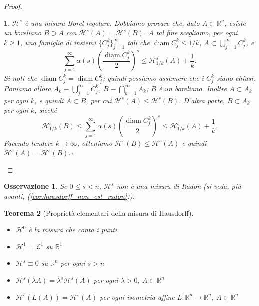\documentclass[a4paper,10pt,openright,oneside]{book}
\theoremstyle{theoremstyle}
\newtheorem{teorema}{Teorema}[section]
\theoremstyle{theoremstylewoheader}
\theoremstyle{theoremstyle}
\newtheorem{osservazione}[teorema]{Osservazione}
\theoremstyle{proofsecstyle}
\newtheorem{proofsec}{}
\theoremstyle{nonumberplain}
\newtheorem{proof}{Dim.}
\newcommand{\RR}{\ensuremath{\mathbb{R}}}
\newcommand{\Leb}{\ensuremath{\mathcal{L}}}
\newcommand{\Haus}{\ensuremath{\mathcal{H}}}
\newcommand{\closure}[1]{\ensuremath{\overline{#1}}}
\DeclareMathOperator{\diam}{diam}
\renewcommand{\qedsymbol}{\ensuremath{\square}}
\newcommand{\qed}{\unskip\nobreak\hfill\nobreak\hspace{.5em}\qedsymbol}
\begin{document}
\begin{proof}
\begin{proofsec}
\emph{$\Haus^s$ è una misura Borel regolare.}\hspace{.5em} Dobbiamo provare che, dato $A \subset \RR^n$, esiste un boreliano $B \supset A$ con $\Haus^s(A) = \Haus^s(B)$. A tal fine scegliamo, per ogni $k \ge 1$, una famiglia di insiemi $\{C_j^k\}_{j=1}^\infty$ tali che $\diam C_j^k \le 1/k$, $A \subset \bigcup_{j=1}^\infty C_j^k$, e
\[
\sum_{j=1}^\infty \alpha(s)\left(\frac{\diam C_j^k}{2}\right)^s \le \Haus_{1/k}^s (A) + \frac{1}{k}.
\]
Si noti che $\diam \closure{C_j^k} = \diam C_j^k$; quindi possiamo assumere che i $C_j^k$ siano chiusi. Poniamo allora $A_k \equiv \bigcup_{j=1}^\infty C_j^k$, $B \equiv \bigcap_{k=1}^\infty A_k$; $B$ è un boreliano. Inoltre $A \subset A_k$ per ogni $k$, e quindi $A \subset B$, per cui $\Haus^s(A) \le \Haus^s(B)$. D'altra parte, $B \subset A_k$ per ogni $k$, sicché
\[
\Haus_{1/k}^s (B) \le \sum_{j=1}^\infty \alpha(s)\left(\frac{\diam C_j^k}{2}\right)^s \le \Haus_{1/k}^s (A) + \frac{1}{k}.
\]
Facendo tendere $k \to \infty$, otteniamo $\Haus^s(B) \le \Haus^s(A)$ e quindi $\Haus^s(A) = \Haus^s(B)$.\qed
\end{proofsec}
\end{proof}

\begin{osservazione}
Se $0 \le s < n$, $\Haus^s$ \emph{non} è una misura di Radon (si veda, più avanti, (\ref{cor:hausdorff_non_est_radon})).
\end{osservazione}

\begin{teorema}[Proprietà elementari della misura di Hausdorff]
\label{thm:proprieta_misura_hausdorff}
\mbox{}
\begin{itemize}
\item[(i)] $\Haus^0$ è la misura che conta i punti
\item[(ii)] $\Haus^1 = \Leb^1$ su $\RR^1$
\item[(iii)] $\Haus^s \equiv 0$ su $\RR^n$ per ogni $s > n$
\item[(iv)] $\Haus^s (\lambda A) = \lambda^s \Haus^s (A)$ per ogni $\lambda > 0$, $A \subset \RR^n$
\item[(v)] $\Haus^s (L(A)) = \Haus^s (A)$ per ogni isometria affine $L : \RR^n \rightarrow \RR^n$, $A \subset \RR^n$
\end{itemize}
\end{teorema}
\end{document}
